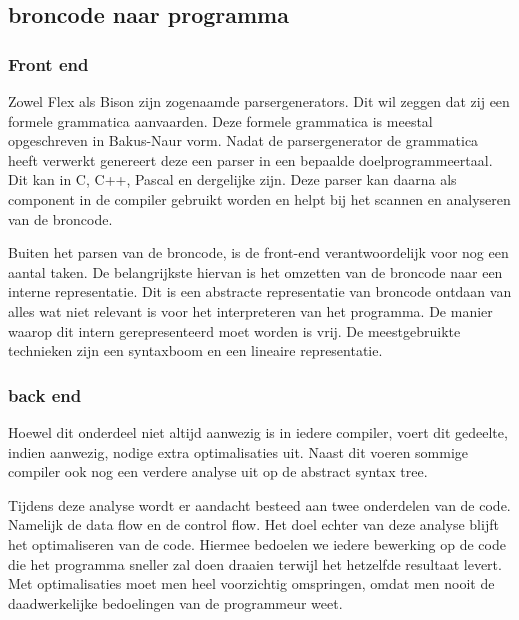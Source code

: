 \documentclass[11pt,a4paper]{article}
\begin{document}
\subsection{broncode naar programma}

\subsubsection{Front end}
Zowel Flex als Bison zijn zogenaamde parsergenerators. Dit wil zeggen dat zij een formele grammatica aanvaarden. Deze formele grammatica is meestal opgeschreven in Bakus-Naur vorm. Nadat de parsergenerator de grammatica heeft verwerkt genereert deze een parser in een bepaalde doelprogrammeertaal. Dit kan in C, C++, Pascal en dergelijke zijn. Deze parser kan daarna als component in de compiler gebruikt worden en helpt bij het scannen en analyseren van de broncode.

Buiten het parsen van de broncode, is de front-end verantwoordelijk voor nog een aantal taken. De belangrijkste hiervan is het omzetten van de broncode naar een interne representatie. Dit is een abstracte representatie van broncode ontdaan van alles wat niet relevant is voor het interpreteren van het programma. De manier waarop dit intern gerepresenteerd moet worden is vrij. De meestgebruikte technieken zijn een syntaxboom en een lineaire representatie. 

\subsubsection{back end}
Hoewel dit onderdeel niet altijd aanwezig is in iedere compiler, voert dit gedeelte, indien aanwezig, nodige extra optimalisaties uit. Naast dit voeren sommige compiler ook nog een verdere analyse uit op de abstract syntax tree.

Tijdens deze analyse wordt er aandacht besteed aan twee onderdelen van de code. Namelijk de data flow en de control flow. Het doel echter van deze analyse blijft het optimaliseren van de code. Hiermee bedoelen we iedere bewerking op de code die het programma sneller zal doen draaien terwijl het hetzelfde resultaat levert. Met optimalisaties moet men heel voorzichtig omspringen, omdat men nooit de daadwerkelijke bedoelingen van de programmeur weet.
\end{document}
